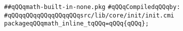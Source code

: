 \label{src/lib/core/init/math-built-in-none.pkg}
\verb|##qQQqmath-built-in-none.pkg|\newline
\newline
\verb|#qQQqCompiledqQQqby:|\newline
\verb|#qQQqqQQqqQQqqQQqqQQqsrc/lib/core/init/init.cmi|\newline
\newline
\verb|packageqQQqmath_inline_tqQQq=qQQq{qQQq};|\newline
\newline

